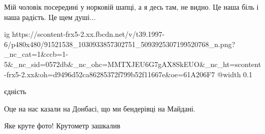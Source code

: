 Мій чоловік посередині у норковій шапці, а я десь там, не видно.
Це наша біль і наша радість. Це щем душі...


\ifcmt
  ig https://scontent-frx5-2.xx.fbcdn.net/v/t39.1997-6/p480x480/91521538_1030933857302751_5093925307199520768_n.png?_nc_cat=1&ccb=1-5&_nc_sid=0572db&_nc_ohc=MMTXJEU6G7gAX8SkEUO&_nc_ht=scontent-frx5-2.xx&oh=d9496d52ca86285372f799b52f11667e&oe=61A206F7
  @width 0.1
\fi

єдність

Оце на нас казали на Донбасі, що ми бендерівці на Майдані.

Яке круте фото! Крутометр зашкалив
